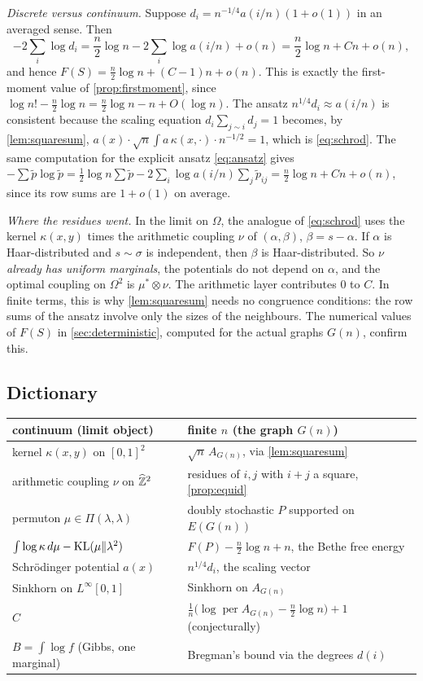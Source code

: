 \emph{Discrete versus continuum.} Suppose $d_i=n^{-1/4}a(i/n)(1+o(1))$ in an averaged sense.
Then
\[
-2\sum_i\log d_i=\frac n2\log n-2\sum_i\log a(i/n)+o(n)=\frac n2\log n+Cn+o(n),
\]
and hence $F(S)=\frac n2\log n+(C-1)n+o(n)$. This is exactly the first-moment value of
\cref{prop:firstmoment}, since $\log n!-\frac n2\log n=\frac n2\log n-n+O(\log n)$. The
ansatz $n^{1/4}d_i\approx a(i/n)$ is consistent because the scaling equation
$d_i\sum_{j\sim i}d_j=1$ becomes, by \cref{lem:squaresum},
$a(x)\cdot\sqrt n\int a\,\kappa(x,\cdot)\cdot n^{-1/2}=1$, which is \eqref{eq:schrod}. The
same computation for the explicit ansatz \eqref{eq:ansatz} gives
$-\sum\widetilde p\log\widetilde p=\frac12\log n\sum\widetilde p-2\sum_i\log a(i/n)\sum_j\widetilde p_{ij}
=\frac n2\log n+Cn+o(n)$, since its row sums are $1+o(1)$ on average.

\emph{Where the residues went.} In the limit on $\Omega$, the analogue of
\eqref{eq:schrod} uses the kernel $\kappa(x,y)$ times the arithmetic coupling $\nu$ of
$(\alpha,\beta)$, $\beta=s-\alpha$. If $\alpha$ is Haar-distributed and $s\sim\sigma$ is
independent, then $\beta$ is Haar-distributed. So $\nu$ \emph{already has uniform
marginals}, the potentials do not depend on $\alpha$, and the optimal coupling on
$\Omega^2$ is $\mu^*\otimes\nu$. The arithmetic layer contributes $0$ to $C$. In finite
terms, this is why \cref{lem:squaresum} needs no congruence conditions: the row sums of
the ansatz involve only the sizes of the neighbours. The numerical values of $F(S)$ in
\cref{sec:deterministic}, computed for the actual graphs $G(n)$, confirm this.

\subsection{Dictionary}
\begin{center}\small
\begin{tabular}{ll}
\toprule
continuum (limit object) & finite $n$ (the graph $G(n)$)\\
\midrule
kernel $\kappa(x,y)$ on $[0,1]^2$ & $\sqrt n\,A_{G(n)}$, via \cref{lem:squaresum}\\
arithmetic coupling $\nu$ on $\widehat{\mathbb{Z}}^2$ & residues of $i,j$ with $i+j$ a square, \cref{prop:equid}\\
permuton $\mu\in\Pi(\lambda,\lambda)$ & doubly stochastic $P$ supported on $E(G(n))$\\
$\int\log\kappa\,d\mu-\mathrm{KL}(\mu\|\lambda^2)$ & $F(P)-\frac n2\log n+n$, the Bethe free energy\\
Schr\"odinger potential $a(x)$ & $n^{1/4}d_i$, the scaling vector\\
Sinkhorn on $L^\infty[0,1]$ & Sinkhorn on $A_{G(n)}$\\
$C$ & $\frac1n\bigl(\log\operatorname{per}A_{G(n)}-\frac n2\log n\bigr)+1$ (conjecturally)\\
$B=\int\log f$ (Gibbs, one marginal) & Bregman's bound via the degrees $d(i)$\\
\bottomrule
\end{tabular}
\end{center}
